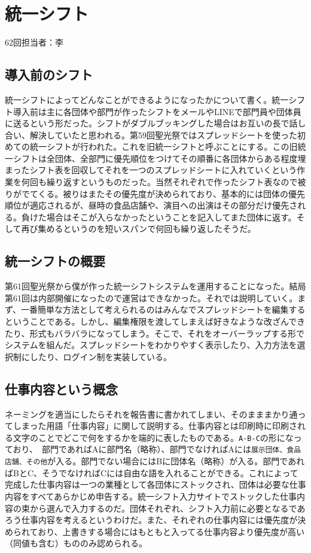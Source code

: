 \documentclass[a4paper]{ltjsreport}
\begin{document}
\section{統一シフト}\label{sec:統一シフト}
62回担当者：李
\subsection{導入前のシフト}
統一シフトによってどんなことができるようになったかについて書く。統一シフト導入前は主に各団体や部門が作ったシフトをメールやLINEで部門員や団体員に送るという形だった。シフトがダブルブッキングした場合はお互いの長で話し合い、解決していたと思われる。第59回聖光祭ではスプレッドシートを使った初めての統一シフトが行われた。これを旧統一シフトと呼ぶことにする。この旧統一シフトは全団体、全部門に優先順位をつけてその順番に各団体からある程度埋まったシフト表を回収してそれを一つのスプレッドシートに入れていくという作業を何回も繰り返すというものだった。当然それぞれで作ったシフト表なので被りがでてくる。被りはまたその優先度が決められており、基本的には団体の優先順位が適応されるが、昼時の食品店舗や、演目への出演はその部分だけ優先される。負けた場合はそこが入らなかったということを記入してまた団体に返す。そして再び集めるというのを短いスパンで何回も繰り返したそうだ。
\subsection{統一シフトの概要}
第61回聖光祭から僕が作った統一シフトシステムを運用することになった。結局第61回は内部開催になったので運営はできなかった。それでは説明していく。まず、一番簡単な方法として考えられるのはみんなでスプレッドシートを編集するということである。しかし、編集権限を渡してしまえば好きなような改ざんできたり、形式もバラバラになってしまう。そこで、それをオーバーラップする形でシステムを組んだ。スプレッドシートをわかりやすく表示したり、入力方法を選択制にしたり、ログイン制を実装している。
\subsection{仕事内容という概念}
ネーミングを適当にしたらそれを報告書に書かれてしまい、そのまままかり通ってしまった用語「仕事内容」に関して説明する。仕事内容とは印刷時に印刷される文字のことでどこで何をするかを端的に表したものである。\verb+A-B-C+の形になっており、　部門であればAに部門名（略称）、部門でなければAには\verb+展示団体、食品店舗、その他+が入る。部門でない場合にはBに団体名（略称）が入る。部門であればBとC、そうでなければCには自由な語を入れることができる。これによって完成した仕事内容は一つの業種として各団体にストックされ、団体は必要な仕事内容をすべてあらかじめ申告する。統一シフト入力サイトでストックした仕事内容の束から選んで入力するのだ。団体それぞれ、シフト入力前に必要となるであろう仕事内容を考えるというわけだ。また、それぞれの仕事内容には優先度が決められており、上書きする場合にはもともと入ってる仕事内容より優先度が高い（同値も含む）もののみ認められる。
\end{document}
